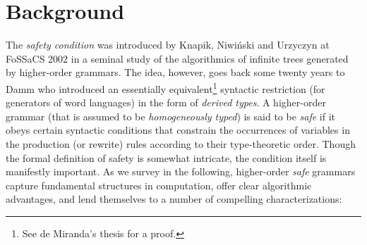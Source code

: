 
\section*{Background}

The \emph{safety condition} was introduced by Knapik, Niwi{\'n}ski
and Urzyczyn at FoSSaCS 2002 \cite{KNU02} in a seminal study of the
algorithmics of infinite trees generated by higher-order grammars.
The idea, however, goes back some twenty years to Damm \cite{Dam82}
who introduced an essentially equivalent\footnote{See de Miranda's
 thesis \cite{demirandathesis} for a proof.} syntactic
restriction (for generators of word languages) in the form of
\emph{derived types}.
A higher-order grammar (that is assumed to be \emph{homogeneously
  typed}) is said to be \emph{safe} if it obeys certain syntactic
conditions that constrain the occurrences of variables in the
production (or rewrite) rules according to their type-theoretic
order. Though the formal definition of safety is somewhat intricate,
the condition itself is manifestly important. As we survey in the
following, higher-order \emph{safe} grammars capture fundamental
structures in computation, offer clear algorithmic advantages, and
lend themselves to a number of compelling characterizations:

